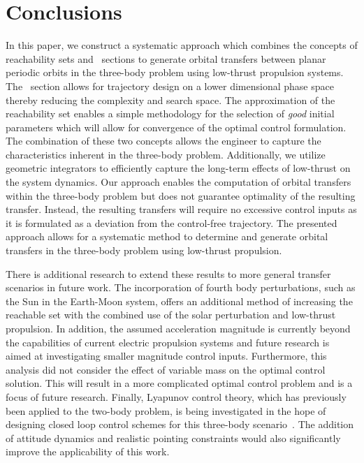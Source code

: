 \documentclass[smallcondensed]{svjour3}
\begin{document}
\section{Conclusions}\label{sec:conclusion}
In this paper, we construct a systematic approach which combines the concepts of reachability sets and \Poincare~sections to generate orbital transfers between planar periodic orbits in the three-body problem using low-thrust propulsion systems.
The \Poincare~section allows for trajectory design on a lower dimensional phase space thereby reducing the complexity and search space.
The approximation of the reachability set enables a simple methodology for the selection of \textit{good} initial parameters which will allow for convergence of the optimal control formulation.
The combination of these two concepts allows the engineer to capture the characteristics inherent in the three-body problem.
Additionally, we utilize geometric integrators to efficiently capture the long-term effects of low-thrust on the system dynamics.
Our approach enables the computation of orbital transfers within the three-body problem but does not guarantee optimality of the resulting transfer.
Instead, the resulting transfers will require no excessive control inputs as it is formulated as a deviation from the control-free trajectory.
The presented approach allows for a systematic method to determine and generate orbital transfers in the three-body problem using low-thrust propulsion.

There is additional research to extend these results to more general transfer scenarios in future work.
The incorporation of fourth body perturbations, such as the Sun in the Earth-Moon system, offers an additional method of increasing the reachable set with the combined use of the solar perturbation and low-thrust propulsion.
In addition, the assumed acceleration magnitude is currently beyond the capabilities of current electric propulsion systems and future research is aimed at investigating smaller magnitude control inputs.
Furthermore, this analysis did not consider the effect of variable mass on the optimal control solution.
This will result in a more complicated optimal control problem and is a focus of future research.
Finally, Lyapunov control theory, which has previously been applied to the two-body problem, is being investigated in the hope of designing closed loop control schemes for this three-body scenario~\cite{chang2002}.
The addition of attitude dynamics and realistic pointing constraints would also significantly improve the applicability of this work.
\end{document}
